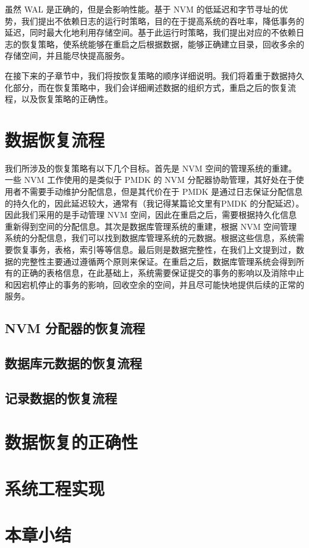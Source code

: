 虽然 WAL 是正确的，但是会影响性能。基于 NVM 的低延迟和字节寻址的优势，我们提出不依赖日志的运行时策略，目的在于提高系统的吞吐率，降低事务的延迟，同时最大化地利用存储空间。基于此运行时策略，我们提出对应的不依赖日志的恢复策略，使系统能够在重启之后根据数据，能够正确建立目录，回收多余的存储空间，并且能尽快提高服务。

在接下来的子章节中，我们将按恢复策略的顺序详细说明。我们将着重于数据持久化部分，而在恢复策略中，我们会详细阐述数据的组织方式，重启之后的恢复流程，以及恢复策略的正确性。

\section{数据恢复流程}

我们所涉及的恢复策略有以下几个目标。首先是 NVM 空间的管理系统的重建。一些 NVM 工作使用的是类似于 PMDK 的 NVM 分配器协助管理，其好处在于使用者不需要手动维护分配信息，但是其代价在于 PMDK 是通过日志保证分配信息的持久化的，因此延迟较大，通常有（我记得某篇论文里有PMDK 的分配延迟）。因此我们采用的是手动管理 NVM 空间，因此在重启之后，需要根据持久化信息重新得到空间的分配信息。其次是数据库管理系统的重建，根据 NVM 空间管理系统的分配信息，我们可以找到数据库管理系统的元数据。根据这些信息，系统需要恢复事务，表格，索引等等信息。最后则是数据完整性，在我们上文提到过，数据的完整性主要通过遵循两个原则来保证。在重启之后，数据库管理系统会得到所有的正确的表格信息，在此基础上，系统需要保证提交的事务的影响以及消除中止和因宕机停止的事务的影响，回收空余的空间，并且尽可能快地提供后续的正常的服务。

\subsection{NVM 分配器的恢复流程}

\subsection{数据库元数据的恢复流程}

\subsection{记录数据的恢复流程}

\section{数据恢复的正确性}


\section{系统工程实现}

\section{本章小结}